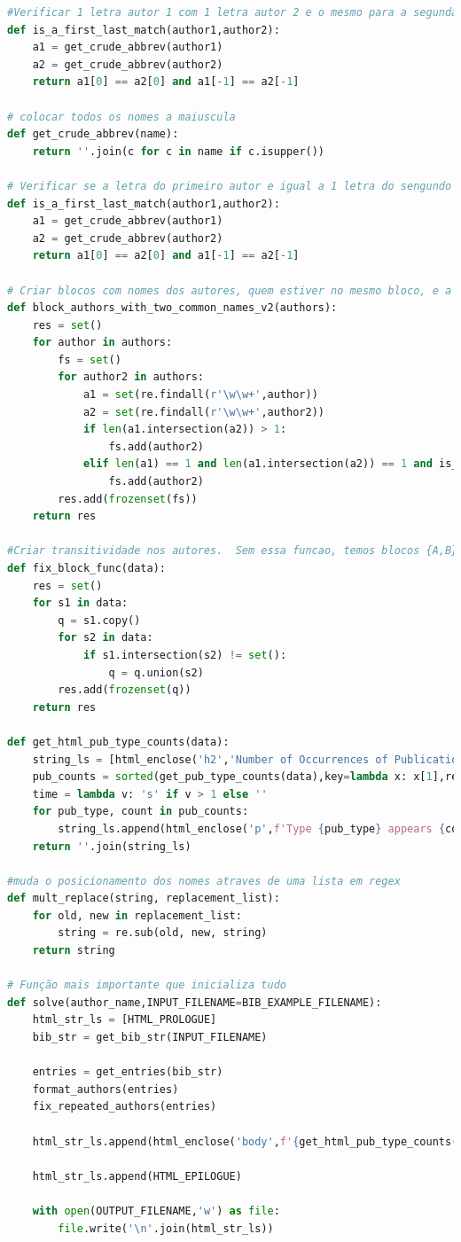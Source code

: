 \documentclass[11pt,a4paper]{report}
\begin{document}
\begin{lstlisting}[language=python]
#Verificar 1 letra autor 1 com 1 letra autor 2 e o mesmo para a segunda
def is_a_first_last_match(author1,author2):
    a1 = get_crude_abbrev(author1)
    a2 = get_crude_abbrev(author2)
    return a1[0] == a2[0] and a1[-1] == a2[-1]

# colocar todos os nomes a maiuscula
def get_crude_abbrev(name):
    return ''.join(c for c in name if c.isupper())

# Verificar se a letra do primeiro autor e igual a 1 letra do sengundo autor e o mesmo para a 2 letra 
def is_a_first_last_match(author1,author2):
    a1 = get_crude_abbrev(author1)
    a2 = get_crude_abbrev(author2)
    return a1[0] == a2[0] and a1[-1] == a2[-1]

# Criar blocos com nomes dos autores, quem estiver no mesmo bloco, e a mesma pessoa.
def block_authors_with_two_common_names_v2(authors):
    res = set()
    for author in authors:
        fs = set()
        for author2 in authors:
            a1 = set(re.findall(r'\w\w+',author))
            a2 = set(re.findall(r'\w\w+',author2))
            if len(a1.intersection(a2)) > 1:
                fs.add(author2)
            elif len(a1) == 1 and len(a1.intersection(a2)) == 1 and is_a_first_last_match(author,author2):
                fs.add(author2)
        res.add(frozenset(fs))
    return res

#Criar transitividade nos autores.  Sem essa funcao, temos blocos {A,B} e {B,C} Depois dessa funcao, vamos ter {A,B,C}
def fix_block_func(data):
    res = set()
    for s1 in data:
        q = s1.copy()
        for s2 in data:
            if s1.intersection(s2) != set():
                q = q.union(s2)
        res.add(frozenset(q))
    return res

def get_html_pub_type_counts(data):
    string_ls = [html_enclose('h2','Number of Occurrences of Publication Types')]
    pub_counts = sorted(get_pub_type_counts(data),key=lambda x: x[1],reverse=True)
    time = lambda v: 's' if v > 1 else ''
    for pub_type, count in pub_counts:
        string_ls.append(html_enclose('p',f'Type {pub_type} appears {count} time{time(count)}'))
    return ''.join(string_ls)

#muda o posicionamento dos nomes atraves de uma lista em regex
def mult_replace(string, replacement_list):
    for old, new in replacement_list:
        string = re.sub(old, new, string)
    return string

# Função mais importante que inicializa tudo
def solve(author_name,INPUT_FILENAME=BIB_EXAMPLE_FILENAME):
    html_str_ls = [HTML_PROLOGUE]
    bib_str = get_bib_str(INPUT_FILENAME)

    entries = get_entries(bib_str)
    format_authors(entries)
    fix_repeated_authors(entries)

    html_str_ls.append(html_enclose('body',f'{get_html_pub_type_counts(entries)}{get_html_common_pub_author(author_name,entries)}{get_html_pub_type_index(entries)}{get_html_author_index(entries)}'))

    html_str_ls.append(HTML_EPILOGUE)

    with open(OUTPUT_FILENAME,'w') as file:
        file.write('\n'.join(html_str_ls))

\end{lstlisting}
\end{document}
